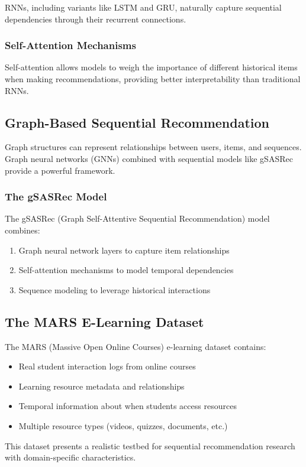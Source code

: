 RNNs, including variants like LSTM and GRU, naturally capture sequential dependencies through their recurrent connections.

\subsubsection{Self-Attention Mechanisms}

Self-attention allows models to weigh the importance of different historical items when making recommendations, providing better interpretability than traditional RNNs.

\subsection{Graph-Based Sequential Recommendation}

Graph structures can represent relationships between users, items, and sequences. Graph neural networks (GNNs) combined with sequential models like gSASRec provide a powerful framework.

\subsubsection{The gSASRec Model}

The gSASRec (Graph Self-Attentive Sequential Recommendation) model combines:

\begin{enumerate}
    \item Graph neural network layers to capture item relationships
    \item Self-attention mechanisms to model temporal dependencies
    \item Sequence modeling to leverage historical interactions
\end{enumerate}

\subsection{The MARS E-Learning Dataset}

The MARS (Massive Open Online Courses) e-learning dataset contains:

\begin{itemize}
    \item Real student interaction logs from online courses
    \item Learning resource metadata and relationships
    \item Temporal information about when students access resources
    \item Multiple resource types (videos, quizzes, documents, etc.)
\end{itemize}

This dataset presents a realistic testbed for sequential recommendation research with domain-specific characteristics.

\newpage
